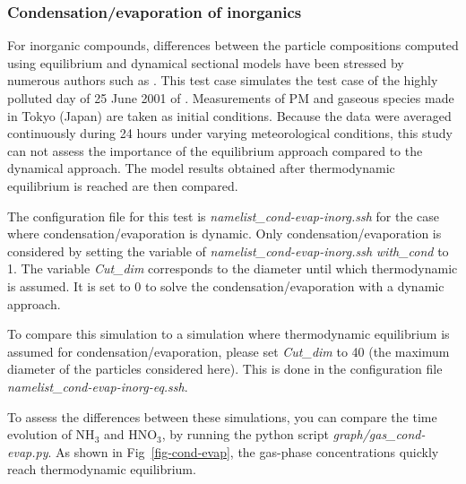 \documentclass[a4paper,11pt]{article}
\begin{document}
\subsubsection{Condensation/evaporation of inorganics}
For inorganic compounds, differences between the particle compositions computed using equilibrium and dynamical sectional models have been stressed by numerous authors such as \cite{sartelet2006development} . This test case simulates the test case of the highly polluted day of 25 June 2001 of \cite{sartelet2006development} .
Measurements of PM and gaseous species made in Tokyo (Japan) are taken as initial conditions. Because the data were averaged continuously during 24 hours under varying meteorological conditions, this study can not assess the importance of the equilibrium approach compared to the dynamical approach. The model results obtained after thermodynamic equilibrium is reached are then compared.

The configuration file for this test is {\it{namelist\_cond-evap-inorg.ssh}} for the case where condensation/evaporation is dynamic. 
Only condensation/evaporation is considered by setting the variable of {\it{namelist\_cond-evap-inorg.ssh}} {\it{with\_cond}} to 1.
The variable {\it{Cut\_dim}} corresponds to the diameter until which thermodynamic is assumed. It is set to 0 to solve the condensation/evaporation with a dynamic approach. 

To compare this simulation to a simulation where thermodynamic equilibrium is assumed for condensation/evaporation, please set  {\it{Cut\_dim}} to 40 (the maximum diameter of the particles considered here). 
This is done in the configuration file {\it{namelist\_cond-evap-inorg-eq.ssh}}.

To assess the differences between these simulations, you can compare the time evolution of NH$_3$ and HNO$_3$, 
by running the python script {\it{graph/gas\_cond-evap.py}}. As shown in
Fig~\ref{fig-cond-evap}, the gas-phase concentrations quickly reach
thermodynamic equilibrium.
\end{document}
